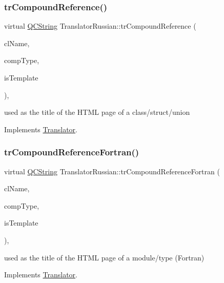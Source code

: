 \subsubsection{\texorpdfstring{trCompoundReference()}{trCompoundReference()}}
{\footnotesize\ttfamily virtual \mbox{\hyperlink{class_q_c_string}{Q\+C\+String}} Translator\+Russian\+::tr\+Compound\+Reference (\begin{DoxyParamCaption}\item[{const char $\ast$}]{cl\+Name,  }\item[{\mbox{\hyperlink{class_class_def_ae70cf86d35fe954a94c566fbcfc87939}{Class\+Def\+::\+Compound\+Type}}}]{comp\+Type,  }\item[{bool}]{is\+Template }\end{DoxyParamCaption})\hspace{0.3cm}{\ttfamily [inline]}, {\ttfamily [virtual]}}

used as the title of the H\+T\+ML page of a class/struct/union 

Implements \mbox{\hyperlink{class_translator}{Translator}}.

\mbox{\label{class_translator_russian_ada738253b091871c769fe1d201a5047c}} 
\subsubsection{\texorpdfstring{trCompoundReferenceFortran()}{trCompoundReferenceFortran()}}
{\footnotesize\ttfamily virtual \mbox{\hyperlink{class_q_c_string}{Q\+C\+String}} Translator\+Russian\+::tr\+Compound\+Reference\+Fortran (\begin{DoxyParamCaption}\item[{const char $\ast$}]{cl\+Name,  }\item[{\mbox{\hyperlink{class_class_def_ae70cf86d35fe954a94c566fbcfc87939}{Class\+Def\+::\+Compound\+Type}}}]{comp\+Type,  }\item[{bool}]{is\+Template }\end{DoxyParamCaption})\hspace{0.3cm}{\ttfamily [inline]}, {\ttfamily [virtual]}}

used as the title of the H\+T\+ML page of a module/type (Fortran) 

Implements \mbox{\hyperlink{class_translator}{Translator}}.

